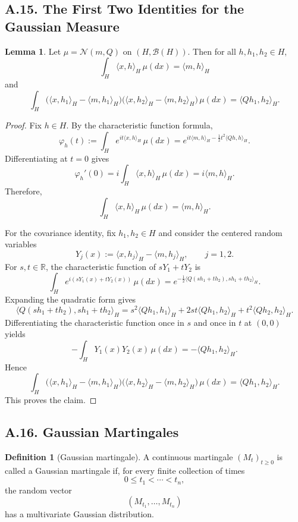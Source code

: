 \documentclass[11pt]{article}
\theoremstyle{definition}
\newtheorem{definition}{Definition}
\newtheorem{lemma}{Lemma}
\theoremstyle{remark}
\begin{document}
\subsection*{A.15. The First Two Identities for the Gaussian Measure}
\begin{lemma}
Let $\mu=\mathcal N(m,Q)$ on $(H,\mathcal B(H))$. Then for all $h,h_1,h_2\in H$,
\[
\int_H \langle x,h\rangle_H\,\mu(dx)=\langle m,h\rangle_H
\]
and
\[
\int_H
\bigl(\langle x,h_1\rangle_H-\langle m,h_1\rangle_H\bigr)
\bigl(\langle x,h_2\rangle_H-\langle m,h_2\rangle_H\bigr)\,\mu(dx)
=
\langle Qh_1,h_2\rangle_H.
\]
\end{lemma}

\begin{proof}
Fix $h\in H$. By the characteristic function formula,
\[
\varphi_h(t):=\int_H e^{it\langle x,h\rangle_H}\,\mu(dx)
=
e^{it\langle m,h\rangle_H-\frac12 t^2\langle Qh,h\rangle_H}.
\]
Differentiating at $t=0$ gives
\[
\varphi_h'(0)
=
i\int_H \langle x,h\rangle_H\,\mu(dx)
=
i\langle m,h\rangle_H.
\]
Therefore,
\[
\int_H \langle x,h\rangle_H\,\mu(dx)=\langle m,h\rangle_H.
\]

For the covariance identity, fix $h_1,h_2\in H$ and consider the centered random variables
\[
Y_j(x):=\langle x,h_j\rangle_H-\langle m,h_j\rangle_H,
\qquad j=1,2.
\]
For $s,t\in\mathbb R$, the characteristic function of $sY_1+tY_2$ is
\[
\int_H e^{i(sY_1(x)+tY_2(x))}\,\mu(dx)
=
e^{-\frac12\langle Q(sh_1+th_2),sh_1+th_2\rangle_H}.
\]
Expanding the quadratic form gives
\[
\langle Q(sh_1+th_2),sh_1+th_2\rangle_H
=
s^2\langle Qh_1,h_1\rangle_H+2st\langle Qh_1,h_2\rangle_H+t^2\langle Qh_2,h_2\rangle_H.
\]
Differentiating the characteristic function once in $s$ and once in $t$ at $(0,0)$ yields
\[
-\int_H Y_1(x)Y_2(x)\,\mu(dx)=-\langle Qh_1,h_2\rangle_H.
\]
Hence
\[
\int_H
\bigl(\langle x,h_1\rangle_H-\langle m,h_1\rangle_H\bigr)
\bigl(\langle x,h_2\rangle_H-\langle m,h_2\rangle_H\bigr)\,\mu(dx)
=
\langle Qh_1,h_2\rangle_H.
\]
This proves the claim.
\end{proof}

\subsection*{A.16. Gaussian Martingales}
\begin{definition}[Gaussian martingale]
A continuous martingale $(M_t)_{t\ge 0}$ is called a Gaussian martingale if, for every finite collection of times
\[
0\le t_1<\cdots < t_n,
\]
the random vector
\[
(M_{t_1},\dots,M_{t_n})
\]
has a multivariate Gaussian distribution.
\end{definition}
\end{document}
